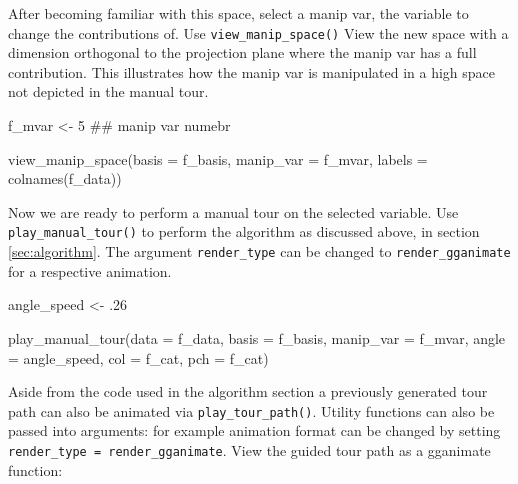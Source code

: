 \begin{Schunk}
\end{Schunk}

After becoming familiar with this space, select a manip var, the
variable to change the contributions of. Use
\texttt{view\_manip\_space()} View the new space with a dimension
orthogonal to the projection plane where the manip var has a full
contribution. This illustrates how the manip var is manipulated in a
high space not depicted in the manual tour.

\begin{Schunk}
\begin{Sinput}
f_mvar  <- 5  ## manip var numebr

view_manip_space(basis = f_basis, 
                 manip_var = f_mvar, 
                 labels = colnames(f_data))
\end{Sinput}
\end{Schunk}

Now we are ready to perform a manual tour on the selected variable. Use
\texttt{play\_manual\_tour()} to perform the algorithm as discussed
above, in section \ref{sec:algorithm}. The argument
\texttt{render\_type} can be changed to \texttt{render\_gganimate} for a
respective animation.

\begin{Schunk}
\begin{Sinput}
angle_speed <- .26

play_manual_tour(data = f_data,
                 basis = f_basis, 
                 manip_var = f_mvar, 
                 angle = angle_speed,
                 col = f_cat,
                 pch = f_cat)
\end{Sinput}
\end{Schunk}

Aside from the code used in the algorithm section a previously generated
tour path can also be animated via \texttt{play\_tour\_path()}. Utility
functions can also be passed into arguments: for example animation
format can be changed by setting
\texttt{render\_type\ =\ render\_gganimate}. View the guided tour path
as a gganimate function:

